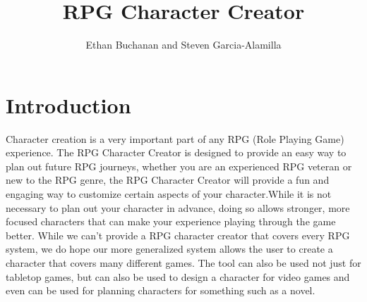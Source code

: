 \documentclass[10pt,conference,onecolumn,compsoc]{IEEEtran}
\begin{document}
\title{RPG Character Creator}
%
%


\author{Ethan Buchanan and Steven Garcia-Alamilla \\%
}



\maketitle



\IEEEdisplaynontitleabstractindextext

\IEEEpeerreviewmaketitle



\section{Introduction}



Character creation is a very important part of any RPG (Role Playing Game) experience. The RPG Character Creator is designed to provide an easy way to plan out future RPG journeys, whether you are an experienced RPG veteran or new to the RPG genre, the RPG Character Creator will provide a fun and engaging way to customize certain aspects of your character.While it is not necessary to plan out your character in advance, doing so allows stronger, more focused characters that can make your experience playing through the game better. While we can't provide a RPG character creator that covers every RPG system, we do hope our more generalized system allows the user to create a character that covers many different games. The tool can also be used not just for tabletop games, but can also be used to design a character for video games and even can be used for planning characters for something such as a novel.
\end{document}

